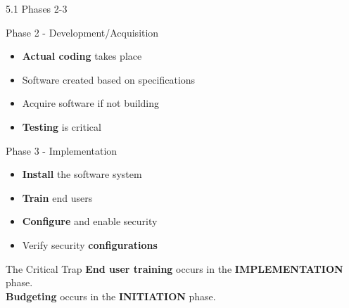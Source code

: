 \documentclass{beamer}
\begin{document}
	\begin{frame}{5.1 Phases 2-3}
		\begin{block}{Phase 2 - Development/Acquisition}
			\begin{itemize}
				\item \textbf{Actual coding} takes place
				\item Software created based on specifications
				\item Acquire software if not building
				\item \textbf{Testing} is critical
			\end{itemize}
		\end{block}
		
		\begin{block}{Phase 3 - Implementation}
			\begin{itemize}
				\item \textbf{Install} the software system
				\item \textbf{Train} end users
				\item \textbf{Configure} and enable security
				\item Verify security \textbf{configurations}
			\end{itemize}
		\end{block}
		
		\begin{alertblock}{The Critical Trap}
			\textbf{End user training} occurs in the \textbf{IMPLEMENTATION} phase. \\
			\textbf{Budgeting} occurs in the \textbf{INITIATION} phase.
		\end{alertblock}
	\end{frame}
	
\end{document}
